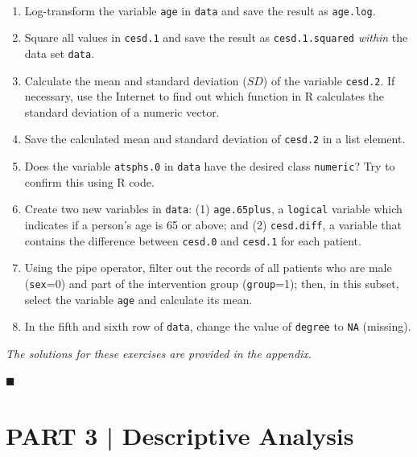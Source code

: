 \begin{box-info-continued} \\
\begin{enumerate}
    \item Log-transform the variable \texttt{age} in \texttt{data} and save the result as \texttt{age.log}.
    \item Square all values in \texttt{cesd.1} and save the result as \texttt{cesd.1.squared} \emph{within} the data set \texttt{data}.
    \item Calculate the mean and standard deviation ($SD$) of the variable \texttt{cesd.2}. If necessary, use the Internet to find out which function in \textsf{R} calculates the standard deviation of a numeric vector.
    \item Save the calculated mean and standard deviation of \texttt{cesd.2} in a list element.
    \item Does the variable \texttt{atsphs.0} in \texttt{data} have the desired class \texttt{numeric}? Try to confirm this using \textsf{R} code.
    \item Create two new variables in \texttt{data}: (1) \texttt{age.65plus}, a \texttt{logical} variable which indicates if a person's age is 65 or above; and (2) \texttt{cesd.diff}, a variable that contains the difference between \texttt{cesd.0} and \texttt{cesd.1} for each patient.
    \item Using the pipe operator, filter out the records of all patients who are male (\texttt{sex}=0) and part of the intervention group (\texttt{group}=1); then, in this subset, select the variable \texttt{age} and calculate its mean.
    \item In the fifth and sixth row of \texttt{data}, change the value of \texttt{degree} to \texttt{NA} (missing).
\end{enumerate}
\begin{flushright}
\emph{The solutions for these exercises are provided in the appendix.}
\end{flushright}
\end{box-info-continued}


\begin{flushright}
    $\blacksquare$
\end{flushright}


\section{{\textsf{\textcolor{sBlue}{\small PART 3 |}}} Descriptive Analysis}


